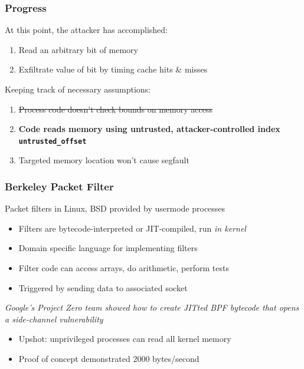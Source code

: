\documentclass[10pt]{beamer}
\begin{document}

\begin{frame}

\frametitle{Progress}

At this point, the attacker has accomplished:
\begin{enumerate}
  \item Read an arbitrary bit of memory
  \item Exfiltrate value of bit by timing cache hits \& misses \\[1em]
\end{enumerate}

Keeping track of necessary assumptions:
\begin{enumerate}
  \item \sout{Process code doesn't check bounds on memory access}
  \item \textbf{Code reads memory using untrusted, attacker-controlled index \texttt{untrusted\_offset}}
  \item Targeted memory location won't cause segfault
\end{enumerate}

\end{frame}


\begin{frame}

\frametitle{Berkeley Packet Filter}

Packet filters in Linux, BSD provided by usermode processes \pause
\begin{itemize}
  \item Filters are bytecode-interpreted or JIT-compiled, run \emph{in kernel}
  \item Domain specific language for implementing filters
  \item Filter code can access arrays, do arithmetic, perform tests
  \item Triggered by sending data to associated socket \\[1em]
\end{itemize}

\pause
\begin{center}
\emph{Google's Project Zero team showed how to create JITted BPF bytecode that opens a side-channel vulnerability}
\end{center}
\pause
\begin{itemize}
  \item Upshot: unprivileged processes can read all kernel memory
  \item Proof of concept demonstrated 2000 bytes/second
\end{itemize}

\end{frame}
\end{document}
